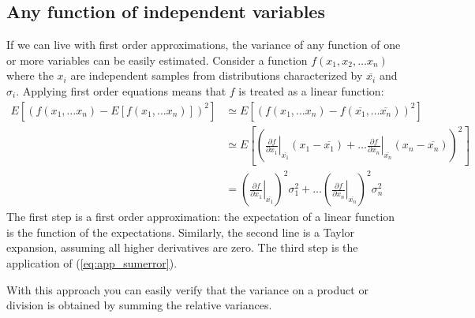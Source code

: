 \documentclass[11pt,oneside]{book}
\begin{document}
\subsection{Any function of independent variables}
If we can live with first order approximations, the variance of any function
of one or more variables can be easily estimated. Consider a function
$f(x_1, x_2, \ldots x_n)$ where the $x_i$ are independent samples from
distributions characterized by $\overline{x_i}$ and $\sigma_i$. Applying first order
equations means that $f$ is treated as a linear function:
\begin{align}
  E\left[\left( f(x_1, \ldots x_n) - E\left[f(x_1, \ldots x_n)\right]\right)^2\right]
  &\simeq  E\left[\left( f(x_1,\ldots x_n) 
        - f(\overline{x_1}, \ldots \overline{x_n})\right)^2\right] \nonumber \\
  &\simeq  E\left[\left( \left. \frac{\partial f}{\partial x_1} \right|_{\overline{x_1}}
                 (x_1 - \overline{x_1}) + \ldots
            \left. \frac{\partial f}{\partial x_n} \right|_{\overline{x_n}}
                 (x_n - \overline{x_n}) \right)^2\right] \nonumber \\
  &= \left( \left. \frac{\partial f}{\partial x_1} \right|_{\overline{x_1}} \right)^2
        \sigma_1^2 + \ldots
    \left( \left. \frac{\partial f}{\partial x_n} \right|_{\overline{x_n}} \right)^2
         \sigma_n^2
\end{align}
The first step is a first order approximation: the expectation of a linear
function is the function of the expectations. Similarly, the second line is a
Taylor expansion, assuming all higher derivatives are zero. The third step is
the application of (\ref{eq:app_sumerror}).

With this approach you can easily verify that the variance on a product or
division is obtained by summing the relative variances.

\newpage
\end{document}

